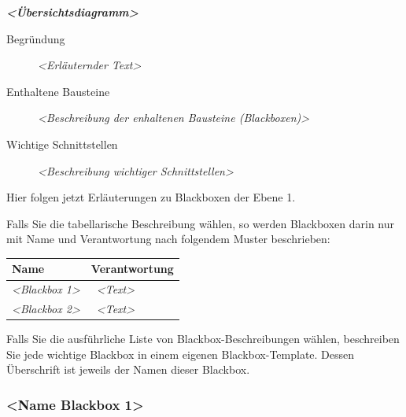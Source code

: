 \documentclass[]{article}
\begin{document}
\emph{\textbf{\textless{}Übersichtsdiagramm\textgreater{}}}

\begin{description}
\item[Begründung]
\emph{\textless{}Erläuternder Text\textgreater{}}
\item[Enthaltene Bausteine]
\emph{\textless{}Beschreibung der enhaltenen Bausteine
(Blackboxen)\textgreater{}}
\item[Wichtige Schnittstellen]
\emph{\textless{}Beschreibung wichtiger Schnittstellen\textgreater{}}
\end{description}

Hier folgen jetzt Erläuterungen zu Blackboxen der Ebene 1.

Falls Sie die tabellarische Beschreibung wählen, so werden Blackboxen
darin nur mit Name und Verantwortung nach folgendem Muster beschrieben:

\begin{longtable}[]{@{}ll@{}}
\toprule
\begin{minipage}[b]{0.31\columnwidth}\raggedright\strut
\textbf{Name}\strut
\end{minipage} & \begin{minipage}[b]{0.63\columnwidth}\raggedright\strut
\textbf{Verantwortung}\strut
\end{minipage}\tabularnewline
\midrule
\endhead
\begin{minipage}[t]{0.31\columnwidth}\raggedright\strut
\emph{\textless{}Blackbox 1\textgreater{}}\strut
\end{minipage} & \begin{minipage}[t]{0.63\columnwidth}\raggedright\strut
~\emph{\textless{}Text\textgreater{}}\strut
\end{minipage}\tabularnewline
\begin{minipage}[t]{0.31\columnwidth}\raggedright\strut
\emph{\textless{}Blackbox 2\textgreater{}}\strut
\end{minipage} & \begin{minipage}[t]{0.63\columnwidth}\raggedright\strut
~\emph{\textless{}Text\textgreater{}}\strut
\end{minipage}\tabularnewline
\bottomrule
\end{longtable}

Falls Sie die ausführliche Liste von Blackbox-Beschreibungen wählen,
beschreiben Sie jede wichtige Blackbox in einem eigenen
Blackbox-Template. Dessen Überschrift ist jeweils der Namen dieser
Blackbox.

\subsubsection{\textless{}Name Blackbox
1\textgreater{}}\label{__name_blackbox_1}
\end{document}
